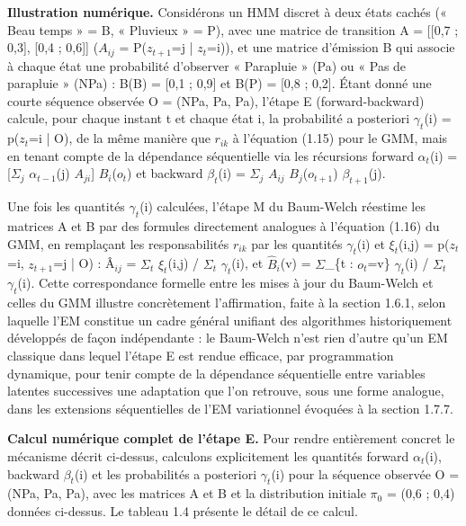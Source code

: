 \textbf{Illustration numérique. }Considérons un HMM discret à deux états cachés (« Beau temps » = B, « Pluvieux » = P), avec une matrice de transition A = [[0,7 ; 0,3], [0,4 ; 0,6]] ($A_{ij}$ = P($z_{t+1}$=j | $z_{t}$=i)), et une matrice d'émission B qui associe à chaque état une probabilité d'observer « Parapluie » (Pa) ou « Pas de parapluie » (NPa) : B(B) = [0,1 ; 0,9] et B(P) = [0,8 ; 0,2]. Étant donné une courte séquence observée O = (NPa, Pa, Pa), l'étape E (forward-backward) calcule, pour chaque instant t et chaque état i, la probabilité a posteriori $\gamma _{t}$(i) = p($z_{t}$=i | O), de la même manière que $r_{ik}$ à l'équation (1.15) pour le GMM, mais en tenant compte de la dépendance séquentielle via les récursions forward $\alpha _{t}$(i) = [$\Sigma _{j}$ $\alpha _{t-1}$(j) $A_{ji}$] $B_{i}$($o_{t}$) et backward $\beta _{t}$(i) = $\Sigma _{j}$ $A_{ij}$ $B_{j}$($o_{t+1}$) $\beta _{t+1}$(j).

Une fois les quantités $\gamma _{t}$(i) calculées, l'étape M du Baum-Welch réestime les matrices A et B par des formules directement analogues à l'équation (1.16) du GMM, en remplaçant les responsabilités $r_{ik}$ par les quantités $\gamma _{t}$(i) et $\xi _{t}$(i,j) = p($z_{t}$=i, $z_{t+1}$=j | O) : Â$_{ij}$ = $\Sigma _{t}$ $\xi _{t}$(i,j) / $\Sigma _{t}$ $\gamma _{t}$(i), et $\hat{B}$$_{i}$(v) = $\Sigma $\_\{t : $o_{t}$=v\} $\gamma _{t}$(i) / $\Sigma _{t}$ $\gamma _{t}$(i). Cette correspondance formelle entre les mises à jour du Baum-Welch et celles du GMM illustre concrètement l'affirmation, faite à la section 1.6.1, selon laquelle l'EM constitue un cadre général unifiant des algorithmes historiquement développés de façon indépendante : le Baum-Welch n'est rien d'autre qu'un EM classique dans lequel l'étape E est rendue efficace, par programmation dynamique, pour tenir compte de la dépendance séquentielle entre variables latentes successives  une adaptation que l'on retrouve, sous une forme analogue, dans les extensions séquentielles de l'EM variationnel évoquées à la section 1.7.7.

\textbf{Calcul numérique complet de l'étape E. }Pour rendre entièrement concret le mécanisme décrit ci-dessus, calculons explicitement les quantités forward $\alpha _{t}$(i), backward $\beta _{t}$(i) et les probabilités a posteriori $\gamma _{t}$(i) pour la séquence observée O = (NPa, Pa, Pa), avec les matrices A et B et la distribution initiale $\pi _{0}$ = (0,6 ; 0,4) données ci-dessus. Le tableau 1.4 présente le détail de ce calcul.

